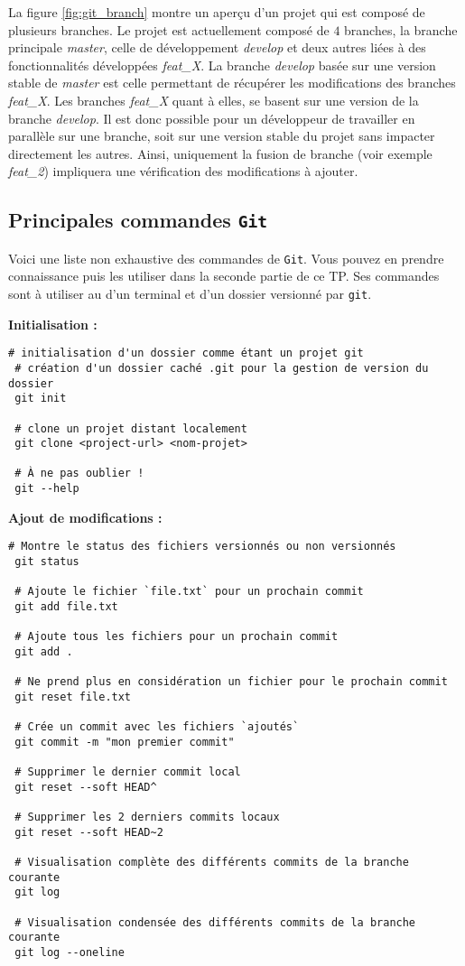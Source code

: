 \documentclass[11pt,a4paper,oneside]{article}
\begin{document}
\vspace{2mm}
La figure \ref{fig:git_branch} montre un aperçu d'un projet qui est composé de plusieurs branches. Le projet est actuellement composé de $4$ branches, la branche principale \textit{master}, celle de développement \textit{develop} et deux autres liées à des fonctionnalités développées \textit{feat\_X}. La branche \textit{develop} basée sur une version stable de \textit{master} est celle permettant de récupérer les modifications des branches \textit{feat\_X}. Les branches \textit{feat\_X} quant à elles, se basent sur une version de la branche \textit{develop}. Il est donc possible pour un développeur de travailler en parallèle sur une branche, soit sur une version stable du projet sans impacter directement les autres. Ainsi, uniquement la fusion de branche (voir exemple \textit{feat\_2}) impliquera une vérification des modifications à ajouter.

\subsection{Principales commandes \texttt{Git}}

Voici une liste non exhaustive des commandes de \texttt{Git}. Vous pouvez en prendre connaissance puis les utiliser dans la seconde partie de ce TP. Ses commandes sont à utiliser au d'un terminal et d'un dossier versionné par \texttt{git}.

\vspace{4mm}
\textbf{Initialisation :}
\begin{lstlisting}[style=custombash]
 # initialisation d'un dossier comme étant un projet git
 # création d'un dossier caché .git pour la gestion de version du dossier
 git init

 # clone un projet distant localement
 git clone <project-url> <nom-projet>

 # À ne pas oublier !
 git --help
\end{lstlisting}

\vspace{4mm}
\textbf{Ajout de modifications :}
\begin{lstlisting}[style=custombash]
 # Montre le status des fichiers versionnés ou non versionnés
 git status

 # Ajoute le fichier `file.txt` pour un prochain commit
 git add file.txt

 # Ajoute tous les fichiers pour un prochain commit
 git add .
 
 # Ne prend plus en considération un fichier pour le prochain commit
 git reset file.txt

 # Crée un commit avec les fichiers `ajoutés`
 git commit -m "mon premier commit"

 # Supprimer le dernier commit local
 git reset --soft HEAD^

 # Supprimer les 2 derniers commits locaux
 git reset --soft HEAD~2

 # Visualisation complète des différents commits de la branche courante
 git log

 # Visualisation condensée des différents commits de la branche courante
 git log --oneline
\end{lstlisting}
\end{document}
